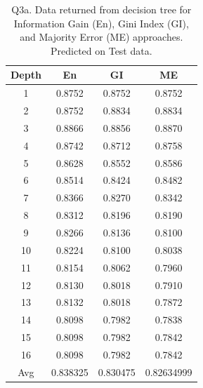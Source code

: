 \documentclass[12pt, fullpage,letterpaper]{article}
\begin{document}
    \begin{table}[h]
    	\centering
    	\begin{tabular}{c|ccc}
    		Depth & En & GI & ME \\ 
    		\hline\hline
    		1 &  0.8752 & 0.8752 & 0.8752 \\ \hline
    		2 &  0.8752 & 0.8834 & 0.8834 \\ \hline
    		3 &  0.8866 & 0.8856 & 0.8870 \\ \hline
    		4 &  0.8742 & 0.8712 & 0.8758 \\ \hline
            5 &  0.8628 & 0.8552 & 0.8586 \\ \hline
            6 &  0.8514 & 0.8424 & 0.8482 \\ \hline
            7 &  0.8366 & 0.8270 & 0.8342 \\ \hline
            8 &  0.8312 & 0.8196 & 0.8190 \\ \hline
            9 &  0.8266 & 0.8136 & 0.8100 \\ \hline
            10 & 0.8224 & 0.8100 & 0.8038 \\ \hline
            11 & 0.8154 & 0.8062 & 0.7960 \\ \hline
            12 & 0.8130 & 0.8018 & 0.7910 \\ \hline
            13 & 0.8132 & 0.8018 & 0.7872 \\ \hline
            14 & 0.8098 & 0.7982 & 0.7838 \\ \hline
            15 & 0.8098 & 0.7982 & 0.7842 \\ \hline
            16 & 0.8098 & 0.7982 & 0.7842 \\ \hline
            \hline
            Avg & 0.838325 & 0.830475 & 0.82634999

    	\end{tabular}
    	\caption{Q3a. Data returned from decision tree for Information Gain (En), Gini Index (GI), and Majority Error (ME) approaches. Predicted on Test data.}
    \end{table}
\end{document}
